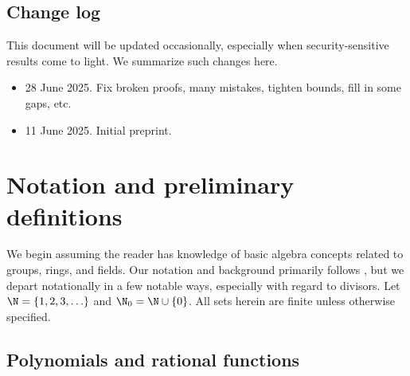 \documentclass[11pt,letterpaper]{article}
\theoremstyle{definition}
\newcommand{\6}{\mathbf}
\newcommand{\7}{\mathcal}
\begin{document}

\subsection{Change log}

This document will be updated occasionally, especially when security-sensitive results come to light. We summarize such changes here.
\begin{itemize}
\item 28 June 2025. Fix broken proofs, many mistakes, tighten bounds, fill in some gaps, etc.

\item 11 June 2025. Initial preprint.
\end{itemize}


\section{Notation and preliminary definitions}

We begin assuming the reader has knowledge of basic algebra concepts related to groups, rings, and fields. Our notation and background primarily follows \cite{Silverman}, but we depart notationally in a few notable ways, especially with regard to divisors. Let $\N = \left\{1, 2, 3, \ldots\right\}$ and $\N_0 = \N \cup \left\{0\right\}$. All sets herein are finite unless otherwise specified. 

\subsection{Polynomials and rational functions}
\end{document}

